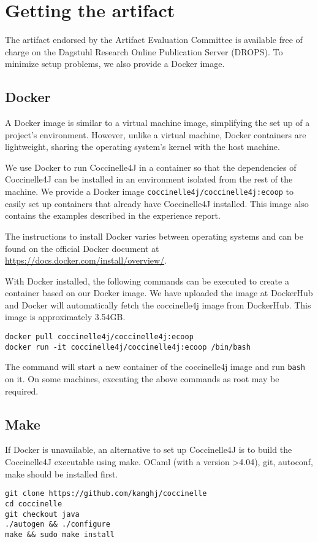 \documentclass[a4paper,UKenglish]{darts-v2019}
\newenvironment{getting}{\section{Getting the artifact} The artifact 
endorsed by the Artifact Evaluation Committee is available free of 
charge on the Dagstuhl Research Online Publication Server (DROPS).}{}
\begin{document}
\begin{getting}
To minimize setup problems, we also provide a Docker image. 

\subsection{Docker}

A Docker image is similar to a virtual machine image, simplifying the set up of a project's environment. 
However, unlike a virtual machine, Docker containers are lightweight, sharing the operating system's kernel with the host machine.

We use Docker to run Coccinelle4J in a container
so that the dependencies of Coccinelle4J can be installed in an environment isolated from the rest of the machine.
We provide a Docker image \texttt{coccinelle4j/coccinelle4j:ecoop} to easily set up containers that already have Coccinelle4J installed. 
This image also contains the examples described in the experience report. 

The instructions to install Docker varies between operating systems and 
can be found on the official Docker document at \url{https://docs.docker.com/install/overview/}.

With Docker installed, the following commands can be executed to create a container based on our Docker image. 
We have uploaded the image at DockerHub and Docker will automatically fetch the coccinelle4j image from DockerHub. This image is approximately 3.54GB.

\begin{lstlisting}
docker pull coccinelle4j/coccinelle4j:ecoop
docker run -it coccinelle4j/coccinelle4j:ecoop /bin/bash
\end{lstlisting}

The command will start a new container of the coccinelle4j image and run \texttt{bash} on it. 
On some machines, executing the above commands as root may be required.

\subsection{Make}

If Docker is unavailable, an alternative to set up Coccinelle4J is to build the Coccinelle4J executable using make. 
OCaml (with a version \textgreater  4.04), git, autoconf, make should be installed first.

\begin{lstlisting}
git clone https://github.com/kanghj/coccinelle
cd coccinelle 
git checkout java
./autogen && ./configure 
make && sudo make install
\end{lstlisting}

\end{getting}
\end{document}
